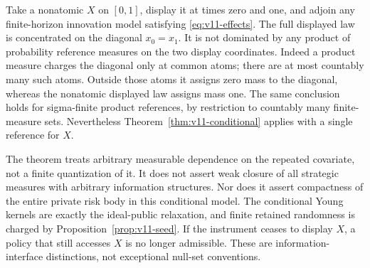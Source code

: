 \begin{example}
\label{ex:v11-singular}
Take a nonatomic $X$ on $[0,1]$, display it at times zero and one, and
adjoin any finite-horizon innovation model satisfying
\eqref{eq:v11-effects}. The full displayed law is concentrated on the
diagonal $x_0=x_1$. It is not dominated by any product of probability
reference measures on the two display coordinates. Indeed a product
measure charges the diagonal only at common atoms; there are at most
countably many such atoms. Outside those atoms it assigns zero mass to
the diagonal, whereas the nonatomic displayed law assigns mass one.
The same conclusion holds for sigma-finite product references, by
restriction to countably many finite-measure sets. Nevertheless
Theorem~\ref{thm:v11-conditional} applies with a single reference for $X$.
\end{example}

\begin{remark}
The theorem treats arbitrary measurable dependence on the repeated
covariate, not a finite quantization of it. It does not assert weak
closure of all strategic measures with arbitrary information structures.
Nor does it assert compactness of the entire private risk body in this
conditional model. The conditional Young kernels are exactly the
ideal-public relaxation, and finite retained randomness is charged by
Proposition~\ref{prop:v11-seed}. If the instrument ceases to display $X$,
a policy that still accesses $X$ is no longer admissible. These are
information-interface distinctions, not exceptional null-set conventions.
\end{remark}
